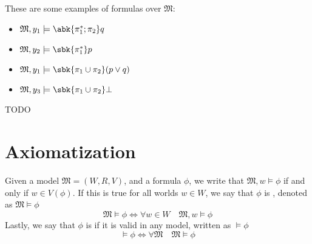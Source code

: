 \documentclass[a4paper, 12pt]{report}
\begin{document}
    These are some examples of formulas over $\mathfrak M$:

    \begin{itemize}
        \item $\mathfrak M, y_1 \models \abk{\pi_1^*; \pi_2} q$
        \item $\mathfrak M, y_2 \models \sbk{\pi_1^*}p$
        \item $\mathfrak M, y_1 \models \sbk{\pi_1 \cup \pi_2}(p \lor q)$
        \item $\mathfrak M, y_3 \models \sbk{\pi_1 \cup \pi_2} \bot$
    \end{itemize}

    TODO 

    \section{Axiomatization}

    Given a model $\mathfrak M = (W, R, V)$, and a formula $\phi$, we write that $\mathfrak M, w \models \phi$ if and only if $w \in V(\phi)$. If this is true for all worlds $w \in W$, we say that $\phi$ is , denoted as $\mathfrak M \models \phi$ $$\mathfrak M \models \phi \iff \forall w \in W \quad \mathfrak M, w \models \phi$$ Lastly, we say that $\phi$ is  if it is valid in any model, written as $\models \phi$ $$\models \phi \iff \forall \mathfrak M \quad \mathfrak M \models \phi$$
\end{document}
